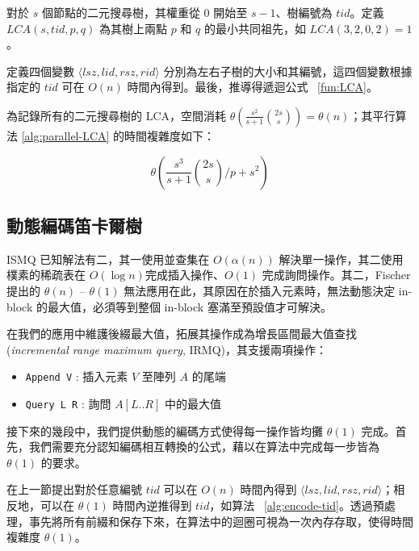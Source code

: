 對於 $s$ 個節點的二元搜尋樹，其權重從 $0$ 開始至 $s-1$、樹編號為 $\mathit{tid}$。定義 $\mathit{LCA}(s, \mathit{tid}, p, q)$ 為其樹上兩點 $p$ 和 $q$ 的最小共同祖先，如 $\mathit{LCA}(3, 2, 0, 2) = 1$。

定義四個變數 $\langle\mathit{lsz},\mathit{lid},\mathit{rsz},\mathit{rid}\rangle$ 分別為左右子樹的大小和其編號，這四個變數根據指定的 $\mathit{tid}$ 可在 $O(n)$ 時間內得到。最後，推導得遞迴公式 ~\ref{fun:LCA}。 

\begin{figure*}[!thb]
  
  \caption{建立所有二元搜尋樹的最小共同祖先}
  \label{fun:LCA}
\end{figure*}

為記錄所有的二元搜尋樹的 LCA，空間消耗 $\theta\left(\frac{s^2}{s+1} \binom{2s}{s}\right) = \theta\left(n\right)$；其平行算法 \ref{alg:parallel-LCA} 的時間複雜度如下：

\begin{equation}
\theta\left(\frac{s^3}{s+1} \binom{2s}{s} \bigg/ p + s^2 \right)
\end{equation}



\subsection{動態編碼笛卡爾樹}

ISMQ 已知解法有二，其一使用並查集在 $O(\alpha(n))$ 解決單一操作，其二使用樸素的稀疏表在 $O(\log n)$完成插入操作、$O(1)$ 完成詢問操作。其二，Fischer \cite{fischer} 提出的 $\theta(n)$ -- $\theta(1)$ 無法應用在此，其原因在於插入元素時，無法動態決定 in-block 的最大值，必須等到整個 in-block 塞滿至預設值才可解決。

在我們的應用中維護後綴最大值，拓展其操作成為增長區間最大值查找 (\emph{incremental range maximum query}, IRMQ)，其支援兩項操作：

\begin{itemize}
  \item \texttt{Append V} : 插入元素 $V$ 至陣列 $A$ 的尾端
  \item \texttt{Query L R} : 詢問 $A[L .. R]$ 中的最大值
\end{itemize}


接下來的幾段中，我們提供動態的編碼方式使得每一操作皆均攤 $\theta(1)$ 完成。首先，我們需要充分認知編碼相互轉換的公式，藉以在算法中完成每一步皆為 $\theta(1)$ 的要求。

在上一節提出對於任意編號 $\mathit{tid}$ 可以在 $O(n)$ 時間內得到 $\langle\mathit{lsz},\mathit{lid},\mathit{rsz},\mathit{rid}\rangle$；相反地，可以在 $\theta(1)$ 時間內逆推得到 $\mathit{tid}$，如算法 ~\ref{alg:encode-tid}。透過預處理，事先將所有前綴和保存下來，在算法中的迴圈可視為一次內存存取，使得時間複雜度 $\theta(1)$。

